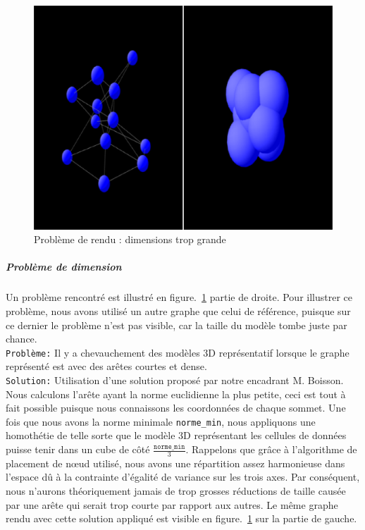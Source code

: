 \documentclass[a4paper, 11pt]{article}
\begin{document}
\begin{figure}[h]
  \begin{center}
    \includegraphics[scale=0.4]{contents/pb2node}
  \end{center}
  \caption{Problème de rendu : dimensions trop grande}
  \label{fig:pb2node}
\end{figure}

\subparagraph{Problème de dimension}

Un problème rencontré est illustré en figure.~\ref{fig:pb2node} partie de droite. Pour illustrer ce problème, nous avons utilisé un autre graphe que celui de référence, puisque sur ce dernier le problème n'est pas visible, car la taille du modèle tombe juste par chance.\\
\texttt{Problème:} Il y a chevauchement des modèles 3D représentatif lorsque le graphe représenté est avec des arêtes courtes et dense.\\
\texttt{Solution:} Utilisation d'une solution proposé par notre encadrant M. Boisson. Nous calculons l'arête ayant la norme euclidienne la plus petite, ceci est tout à fait possible puisque nous connaissons les coordonnées de chaque sommet. Une fois que nous avons la norme minimale \texttt{norme\_min}, nous appliquons une homothétie de telle sorte que le modèle 3D représentant les cellules de données puisse tenir dans un cube de côté $\frac{\texttt{norme\_min}}{3}$. Rappelons que grâce à l'algorithme de placement de nœud utilisé, nous avons une répartition assez harmonieuse dans l'espace dû à la contrainte d'égalité de variance sur les trois axes. Par conséquent, nous n'aurons théoriquement jamais de trop grosses réductions de taille causée par une arête qui serait trop courte par rapport aux autres. Le même graphe rendu avec cette solution appliqué est visible en figure.~\ref{fig:pb2node} sur la partie de gauche.
\end{document}
